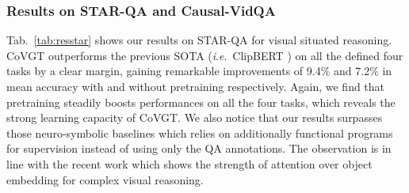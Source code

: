 \documentclass[10pt,journal,compsoc]{IEEEtran}
\newcommand{\ie}{\textit{i}.\textit{e}.}
\begin{document}
\subsubsection{Results on STAR-QA and Causal-VidQA}
Tab.~\ref{tab:resstar} shows our results on STAR-QA for visual situated reasoning. CoVGT outperforms the previous SOTA (\ie~ClipBERT \cite{lei2021less}) on all the defined four tasks by a clear margin, gaining remarkable improvements of 9.4\% and 7.2\% in mean accuracy with and without pretraining respectively. Again, we find that pretraining steadily boosts performances on all the four tasks, which reveals the strong learning capacity of CoVGT. We also notice that our results surpasses those neuro-symbolic baselines \cite{wu2021star,yi2019clevrer} which relies on additionally functional programs for supervision instead of using only the QA annotations. The observation is in line with the recent work \cite{ding2021attention} which shows the strength of attention over object embedding for complex visual reasoning.
\setlength{\tabcolsep}{8pt}
\begin{table}[t!]
    \small
    \centering
    \caption{Accuracy (\%) comparison on STAR-QA \cite{wu2021star}.  I: Interaction, S: Sequence, P: Prediction, F: Feasibility. M: Mean. Other results are token from \cite{wu2021star}.}
    \vspace{-0.5em}
    \label{tab:resstar}
    \vspace{-0.4cm}
\end{table}
\end{document}
